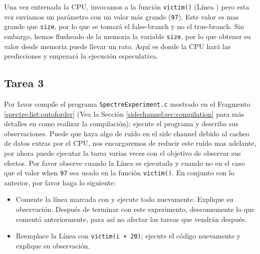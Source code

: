 Una vez entrenada la CPU, invocamos a la función \texttt{victim()} (Línea ) pero esta vez enviamos un parámetro con un valor más grande (\texttt{97}). Este valor es mas grande que \texttt{size}, por lo que se tomará el false-branch y no el true-branch. Sin embargo, hemos flusheado de la memoria la variable \texttt{size}, por lo que obtener su valor desde memoria puede llevar un rato. Aquí es donde la CPU hará las predicciones y empezará la ejecución especulativa.



\subsection{Tarea 3} 

Por favor compile el programa \texttt{SpectreExperiment.c} mostrado en el Fragmento \ref{spectre:list:outoforder}  (Vea la Sección \ref{sidechannel:sec:compilation} para más detalles en como realizar la compilación); ejecute el programa y describa sus observaciones. Puede que haya algo de ruído en el side channel debido al cacheo de datos extras por el CPU, nos encargaremos de reducir este ruído mas adelante, por ahora puede ejecutar la tarea varias veces con el objetivo de observar sus efectos. Por favor observe cuando la Línea  es ejecutada y cuando no en el caso que el valor when \texttt{97} sea usado en la función \texttt{victim()}. 
En conjunto con lo anterior, por favor haga lo siguiente:


\begin{itemize}
\item Comente la línea marcada con  y ejecute todo nuevamente. Explique su observación. Después de terminar con este experimento, descomemente lo que comentó anteriormente, para así no afectar las tareas que vendrán después.

\item Reemplace la Línea  con \texttt{victim(i + 20)}; ejecute el código nuevamente y explique su observación.
\end{itemize}
 



